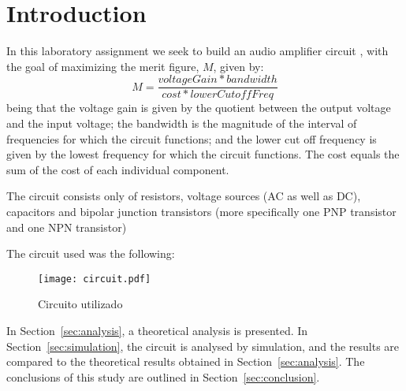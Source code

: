 \section{Introduction}
\label{sec:introduction}

In this laboratory assignment we seek to build an audio amplifier circuit
, with the goal of maximizing the merit figure, $M$, given by:
\begin{equation*}
        M = \frac{voltageGain * bandwidth}{cost * lowerCutoffFreq}
\end{equation*}
being that the voltage gain is given by the quotient between the output voltage and 
the input voltage; the bandwidth is the magnitude of the interval of frequencies
 for which the circuit functions; and the lower cut off frequency is given 
 by the lowest frequency for which the circuit functions. The cost 
 equals the sum of the cost of each individual component.
\par The circuit consists only of resistors, 
voltage sources (AC as well as DC), capacitors 
and bipolar junction transistors (more specifically one 
PNP transistor and one NPN transistor)

The circuit used was the following:

\begin{figure}[H] \centering
\texttt{[image: circuit.pdf]}
\caption{Circuito utilizado}
\label{fig:circuit}
\end{figure}

In Section~\ref{sec:analysis}, a theoretical analysis is
presented. In Section~\ref{sec:simulation}, the circuit is analysed by
simulation, and the results are compared to the theoretical results obtained in
Section~\ref{sec:analysis}. The conclusions of this study are outlined in
Section~\ref{sec:conclusion}.


